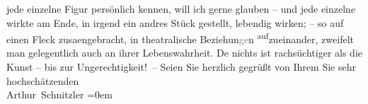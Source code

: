 \begin{ledgroupsized}[t]{13cm}
               jede einzelne Figur persönlich kennen, {\pb}will ich gerne
               glauben – und jede einzelne wirkte am Ende, in irgend ein andres Stück gestellt,
               lebendig wirken; – so auf einen Fleck zusa{\geminationm}engebracht,
               in theatralische Beziehun\textcolor{gray}{ge}n \substVorne{}\textsuperscript{auf}\substDazwischen{}zu\substHinten{}einander, zweifelt man gelegentlich auch an ihrer Lebenswahrheit. De{\geminationn} nichts ist rachsüchtiger als die Kunst – bis zur
               Ungerechtigkeit! –\pend
           \pstart
           Seien Sie herzlich gegrüßt von Ihrem Sie sehr hochschätzenden{\\[\baselineskip]}\spacefill\mbox{Arthur Schnitzler}\pend
           \leftskip=0em{}
         
         \endnumbering{}\end{ledgroupsized}  \newcommand{\dateiname}{L02213}\newcommand{\titel}{Arthur Schnitzler an Robert Adam, 11. 7. 1915}\newcommand{\editorInnen}{Martin Anton Müller und Gerd-Hermann Susen}
      